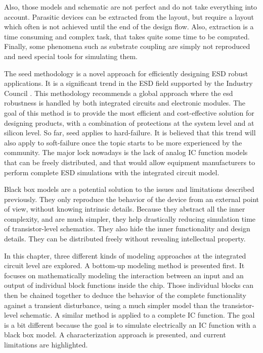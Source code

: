 Also, those models and schematic are not perfect and do not take everything into account.
Parasitic devices can be extracted from the layout, but require a layout which often is not achieved until the end of the design flow.
Also, extraction is a time consuming and complex task, that takes quite some time to be computed.
Finally, some phenomena such as substrate coupling are simply not reproduced and need special tools for simulating them.

The \gls{seed} methodology is a novel approach for efficiently designing ESD robust applications.
It is a significant trend in the ESD field supported by the Industry Council \cite{seed}.
This methodology recommends a global approach where the \gls{esd} robustness is handled by both integrated circuits and electronic modules.
The goal of this method is to provide the most efficient and cost-effective solution for designing products, with a combination of protections at the system level and at silicon level.
So far, \gls{seed} applies to hard-failure.
It is believed that this trend will also apply to soft-failure once the topic starts to be more experienced by the community.
The major lock nowadays is the lack of analog IC function models that can be freely distributed, and that would allow equipment manufacturers to perform complete ESD simulations with the integrated circuit model.

Black box models are a potential solution to the issues and limitations described previously.
They only reproduce the behavior of the device from an external point of view, without knowing intrinsic details.
Because they abstract all the inner complexity, and are much simpler, they help drastically reducing simulation time of transistor-level schematics.
They also hide the inner functionality and design details.
They can be distributed freely without revealing intellectual property.

In this chapter, three different kinds of modeling approaches at the integrated circuit level are explored.
A bottom-up modeling method is presented first.
It focuses on mathematically modeling the interaction between an input and an output of individual block functions inside the chip.
Those individual blocks can then be chained together to deduce the behavior of the complete functionality against a transient disturbance, using a much simpler model than the transistor-level schematic.
A similar method is applied to a complete IC function.
The goal is a bit different because the goal is to simulate electrically an IC function with a black box model.
A characterization approach is presented, and current limitations are highlighted.

